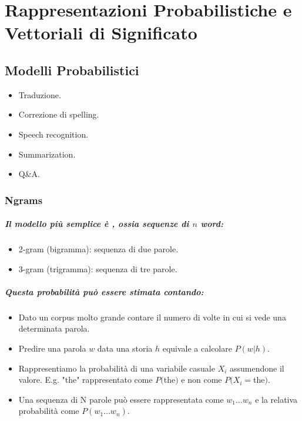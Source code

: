 \chapter{Rappresentazioni Probabilistiche e Vettoriali di Significato}

\section{Modelli Probabilistici}


\begin{itemize}
  \item Traduzione. 
  \item Correzione di spelling. 
  \item Speech recognition. 
  \item Summarization. 
  \item Q\&A.
\end{itemize}


\subsection{Ngrams}

\paragraph{Il modello più semplice è , ossia sequenze di $n$ word:}

\begin{itemize}
  \item 2-gram (bigramma): sequenza di due parole. 
  \item 3-gram (trigramma): sequenza di tre parole.
\end{itemize}


\paragraph{Questa probabilità può essere stimata contando:}

\begin{itemize}
  \item Dato un corpus molto grande contare il numero di volte in cui si vede una determinata parola. 
  \item Predire una parola $w$ data una storia $h$ equivale a calcolare $P(w|h)$. 
  \item Rappresentiamo la probabilità di una variabile casuale $X_i$ assumendone il valore. E.g. "the" rappresentato come $P($the$)$ e non come $P(X_i = $the$)$.
  \item Una sequenza di N parole può essere rappresentata come $w_1\dots w_n$ e la relativa probabilità come $P(w_1\dots w_n)$.
\end{itemize}

